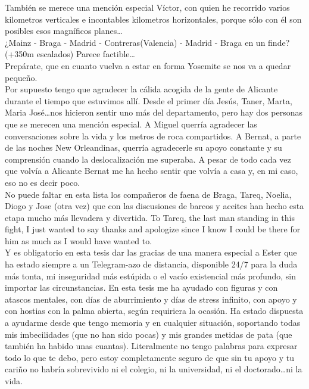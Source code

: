 También se merece una mención especial Víctor, con quien he recorrido varios kilometros verticales e incontables kilometros horizontales, porque sólo con él son posibles esos magníficos planes\dots\\
¿Mainz - Braga - Madrid - Contreras(Valencia) - Madrid - Braga en un finde? (+350m escalados) Parece factible\dots\\
Prepárate, que en cuanto vuelva a estar en forma Yosemite se nos va a quedar pequeño.\\


Por supuesto tengo que agradecer la cálida acogida de la gente de Alicante durante el tiempo que estuvimos allí. Desde el primer día Jesús, Taner, Marta, Maria José\dots nos hicieron sentir uno más del departamento, pero hay dos personas que se merecen una mención especial. A Miguel querría agradecer las conversaciones sobre la vida y los metros de roca compartidos. A Bernat, a parte de las noches New Orleandinas, querría agradecerle su apoyo constante y su comprensión cuando la deslocalización me superaba. A pesar de todo cada vez que volvía a Alicante Bernat me ha hecho sentir que volvía a casa y, en mi caso, eso no es decir poco.\\

No puede faltar en esta lista los compañeros de faena de Braga, Tareq, Noelia, Diogo y Jose (otra vez) que con las discusiones de barcos y aceites han hecho esta etapa mucho más llevadera y divertida. To Tareq, the last man standing in this fight, I just wanted to say thanks and apologize since I know I could be there for him as much as I would have wanted to.\\


Y es obligatorio en esta tesis dar las gracias de una manera especial a Ester que ha estado siempre a un Telegram-azo de distancia, disponible 24/7 para la duda más tonta, mi inseguridad más estúpida o el vacío existencial más profundo, sin importar las circunstancias. En esta tesis me ha ayudado con figuras y con atascos mentales, con días de aburrimiento y días de stress infinito, con apoyo y con hostias con la palma abierta, según requiriera la ocasión.
Ha estado dispuesta a ayudarme desde que tengo memoria y en cualquier situación, soportando todas mis imbecilidades (que no han sido pocas) y mis grandes metidas de pata (que también ha habido unas cuantas).
Literalmente no tengo palabras para expresar todo lo que te debo, pero estoy completamente seguro de que sin tu apoyo y tu cariño no habría sobrevivido ni el colegio, ni la universidad, ni el doctorado\dots ni la vida.\\


